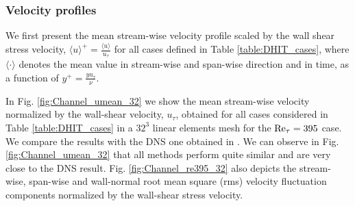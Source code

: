 \subsubsection{Velocity profiles}
We first present the mean stream-wise velocity profile scaled by the wall shear stress velocity, $\langle u\rangle^+=\frac{\langle u\rangle}{u_\tau}$ for all cases defined in Table \ref{table:DHIT_cases}, where $\langle\cdot\rangle$  denotes the mean value in stream-wise and span-wise direction and in time, as a function of $y^+ = \frac{y u_\tau}{\nu}$.

In Fig. \ref{fig:Channel_umean_32} we show the mean stream-wise velocity normalized by the wall-shear velocity, $u_\tau$, obtained for all cases considered in Table \ref{table:DHIT_cases} in a $32^3$ linear elements mesh for the ${\rm Re}_\tau=395$ case. We compare the results with the DNS one obtained in  \cite{moser_direct_1999}. We can observe in Fig. \ref{fig:Channel_umean_32} that all methods perform quite similar and are very close to the DNS result. Fig. \ref{fig:Channel_re395_32} also depicts the stream-wise, span-wise and wall-normal root mean square (rms) velocity fluctuation components normalized by the wall-shear stress velocity. 
